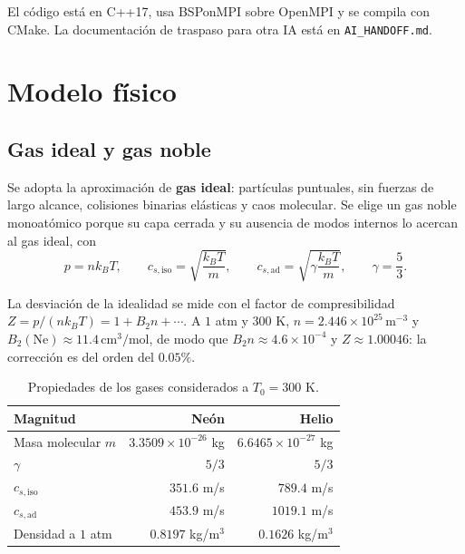 \documentclass[11pt,a4paper]{article}
\begin{document}
El código está en C++17, usa BSPonMPI sobre OpenMPI y se compila con CMake.
La documentación de traspaso para otra IA está en \texttt{AI\_HANDOFF.md}.

\section{Modelo físico}

\subsection{Gas ideal y gas noble}

Se adopta la aproximación de \textbf{gas ideal}: partículas puntuales, sin
fuerzas de largo alcance, colisiones binarias elásticas y caos molecular. Se
elige un gas noble monoatómico porque su capa cerrada y su ausencia de modos
internos lo acercan al gas ideal, con
\begin{equation}
  p = n k_B T, \qquad c_{s,\text{iso}}=\sqrt{\frac{k_B T}{m}},
  \qquad c_{s,\text{ad}}=\sqrt{\gamma\frac{k_B T}{m}},
  \qquad \gamma=\frac{5}{3}.
\end{equation}

La desviación de la idealidad se mide con el factor de compresibilidad
$Z=p/(n k_B T)=1+B_2 n+\cdots$. A $1$ atm y $300$ K,
$n=2.446\times10^{25}\,\text{m}^{-3}$ y $B_2(\text{Ne})\approx
11.4\,\text{cm}^3/\text{mol}$, de modo que $B_2 n\approx 4.6\times10^{-4}$ y
$Z\approx 1.00046$: la corrección es del orden del $0.05\%$.

\begin{table}[H]
\centering
\caption{Propiedades de los gases considerados a $T_0=300$ K.}
\label{tab:gases}
\begin{tabular}{lrr}
\toprule
Magnitud & Neón & Helio \\
\midrule
Masa molecular $m$ & $3.3509\times10^{-26}$ kg & $6.6465\times10^{-27}$ kg \\
$\gamma$ & $5/3$ & $5/3$ \\
$c_{s,\text{iso}}$ & $351.6$ m/s & $789.4$ m/s \\
$c_{s,\text{ad}}$ & $453.9$ m/s & $1019.1$ m/s \\
Densidad a $1$ atm & $0.8197$ kg/m$^3$ & $0.1626$ kg/m$^3$ \\
\bottomrule
\end{tabular}
\end{table}
\end{document}
